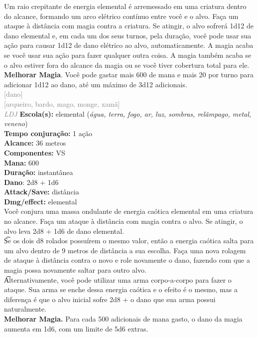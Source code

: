 \documentclass{RPG_Adventure}[2021/10/20]
\begin{document}
{\normalsize Um raio crepitante de energia elemental é arremessado em uma criatura dentro do alcance, formando um arco elétrico contínuo entre você e o alvo. Faça um ataque à distância com magia contra a criatura. Se atingir, o alvo sofrerá 1d12 de dano elemental e, em cada um dos seus turnos, pela duração, você pode usar sua ação para causar 1d12 de dano elétrico ao alvo, automaticamente. A magia acaba se você usar sua ação para fazer qualquer outra coisa. A magia também acaba se o alvo estiver fora do alcance da magia ou se você tiver cobertura total para ele.\\\t \textbf{Melhorar Magia}. Você pode gastar mais 600 de mana e mais 20 por turno para adicionar 1d12 ao dano, até um máximo de 3d12 adicionais.\\}
{\scriptsize \textcolor{gray}{[dano]\\}}
{\scriptsize \textcolor{gray}{[arqueiro, bardo, mago, monge, xamã]\\}}
{\tiny \textcolor{gray}{\textit{LDJ}}}\jump{}
{\small \t \textbf{Escola(s):} elemental (\textit{água, terra, fogo, ar, luz, sombras, relâmpago, metal, veneno})\\\t \textbf{Tempo conjuração:} 1 ação\\\t \textbf{Alcance:} 36 metros\\\t \textbf{Componentes:} VS\\\t \textbf{Mana:} 600\\\t \textbf{Duração:} instantânea\\\t \textbf{Dano}: 2d8 + 1d6\\\t \textbf{Attack/Save:} distância\\\t \textbf{Dmg/effect:} elemental\\}
{\normalsize Você conjura uma massa ondulante de energia caótica elemental em uma criatura no alcance. Faça um ataque à distância com magia contra o alvo. Se atingir, o alvo leva 2d8 + 1d6 de dano elemental.\\\t Se os dois d8 rolados possuírem o mesmo valor, então a energia caótica salta para um alvo dentro de 9 metros de distância a sua escolha. Faça uma nova rolagem de ataque à distância contra o novo e role novamente o dano, fazendo com que a magia possa novamente saltar para outro alvo.\\\t Alternativamente, você pode utilizar uma arma corpo-a-corpo para fazer o ataque. Sua arma se enche dessa energia caótica e o efeito é o mesmo, mas a diferença é que o alvo inicial sofre 2d8 + o dano que sua arma possui naturalmente.\\\t \textbf{Melhorar Magia.} Para cada 500 adicionais de mana gasto, o dano da magia aumenta em 1d6, com um limite de 5d6 extras.\\}
\end{document}
